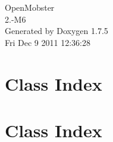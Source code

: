 \documentclass[a4paper]{book}
\begin{document}
\hypersetup{pageanchor=false,citecolor=blue}
\begin{titlepage}
\vspace*{7cm}
\begin{center}
{\Large \-Open\-Mobster \\[1ex]\large 2.-\/\-M6 }\\
\vspace*{1cm}
{\large \-Generated by Doxygen 1.7.5}\\
\vspace*{0.5cm}
{\small Fri Dec 9 2011 12:36:28}\\
\end{center}
\end{titlepage}
\clearemptydoublepage
{}
\tableofcontents
\clearemptydoublepage
{}
\hypersetup{pageanchor=true,citecolor=blue}
\chapter{\-Class \-Index}

\chapter{\-Class \-Index}

\end{document}
